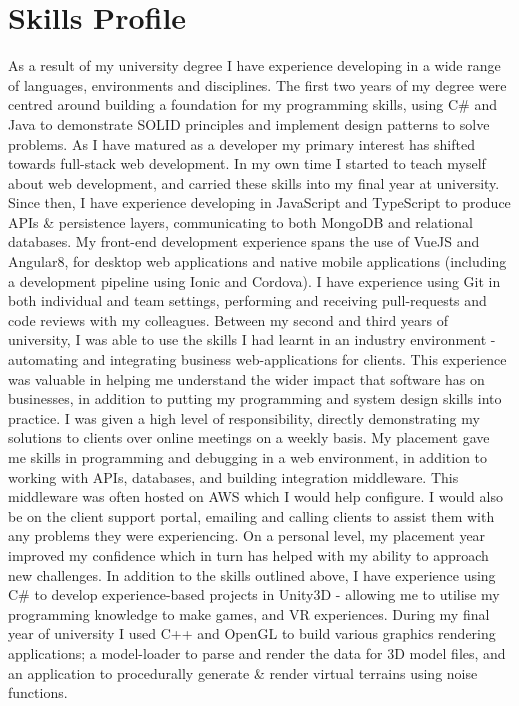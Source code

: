 \documentclass[11pt]{article}
\begin{document}
\section*{Skills Profile}
As a result of my university degree I have experience developing in a wide range of languages, environments and disciplines. The first two years of my degree were centred around building a foundation for my programming skills, using C\# and Java to demonstrate SOLID principles and implement design patterns to solve problems. As I have matured as a developer my primary interest has shifted towards full-stack web development. In my own time I started to teach myself about web development, and carried these skills into my final year at university. Since then, I have experience developing in JavaScript and TypeScript to produce APIs \& persistence layers, communicating to both MongoDB and relational databases. My front-end development experience spans the use of VueJS and Angular8, for desktop web applications and native mobile applications (including a development pipeline using Ionic and Cordova). I have experience using Git in both individual and team settings, performing and receiving pull-requests and code reviews with my colleagues.
\newline\newline
Between my second and third years of university, I was able to use the skills I had learnt in an industry environment - automating and integrating business web-applications for clients. This experience was valuable in helping me understand the wider impact that software has on businesses, in addition to putting my programming and system design skills into practice. I was given a high level of responsibility, directly demonstrating my solutions to clients over online meetings on a weekly basis. My placement gave me skills in programming and debugging in a web environment, in addition to working with APIs, databases, and building integration middleware. This middleware was often hosted on AWS which I would help configure. I would also be on the client support portal, emailing and calling clients to assist them with any problems they were experiencing. On a personal level, my placement year improved my confidence which in turn has helped with my ability to approach new challenges.
\newline\newline
In addition to the skills outlined above, I have experience using C\# to develop experience-based projects in Unity3D - allowing me to utilise my programming knowledge to make games, and VR experiences. During my final year of university I used C++ and OpenGL to build various graphics rendering applications;  a model-loader to parse and render the data for 3D model files, and an application to procedurally generate \& render virtual terrains using noise functions.
\end{document}
